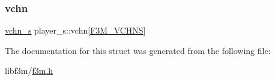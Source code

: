 \subsubsection{\texorpdfstring{vchn}{vchn}}
{\footnotesize\ttfamily \hyperlink{structvchn__s}{vchn\+\_\+s} player\+\_\+s\+::vchn\mbox{[}\hyperlink{f3m_8h_a029404388ed8137e42bc7c94f667dec6}{F3\+M\+\_\+\+V\+C\+H\+NS}\mbox{]}}



The documentation for this struct was generated from the following file\+:\begin{DoxyCompactItemize}
\item 
libf3m/\hyperlink{f3m_8h}{f3m.\+h}\end{DoxyCompactItemize}
